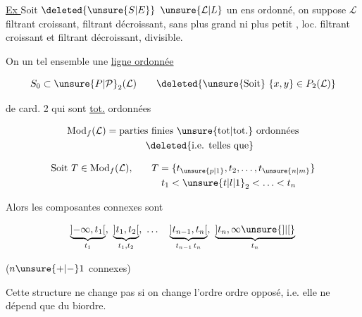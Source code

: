 
\uline{Ex }\quad Soit $\deleted{\unsure{S|E}}$ $\unsure{\mathcal L|L}$ un ens ordonné,
on suppose $\mathcal L$ filtrant croissant, filtrant
décroissant, sans plus grand ni
plus petit , loc. filtrant croissant
et filtrant décroissant, divisible.

On  un tel ensemble une
\uline{ligne ordonnée}

\[
S_0\subset\unsure{P|\mathcal P}_2(\mathcal L)\qquad
\deleted{\text{\unsure{Soit} }\{x,y\}\in P_2(\mathcal L)}
\]

\textquotedbl\quad {}  de card. 2  qui sont \uline{tot.} ordonnées

\[
\begin{aligned}
&\mathrm{Mod}_f(\mathcal L)=\text{parties finies \unsure{tot|tot.} ordonnées}\\
&\hspace{8em}\deleted{\text{i.e. telles que}}
\end{aligned}
\]

\[
\begin{aligned}
 \text{Soit }T\in\mathrm{Mod}_f(\mathcal L),\qquad &T=\{t_{\unsure{p|1}},t_2,\ldots,t_{\unsure{n|m}}\}\\
 &\quad t_1<\unsure{t|l|1}_2<\ldots<t_n
\end{aligned}
\]

Alors les composantes connexes sont

\[
\underbrace{\mathopen{]}-\infty,t_1\mathclose{[}}_{t_1},\
\underbrace{\mathopen{]}t_1,t_2\mathclose{[}}_{t_1,t_2},\
\ldots\quad
\underbrace{\mathopen{]}t_{n-1},t_n\mathclose{[}}_{t_{n-1}\,t_n},\
\underbrace{\mathopen{]}t_n,\infty\mathclose{\unsure{]|[}}}_{t_n}
\]


($n\unsure{+|-}1$  connexes)

\rotatebox{90}{\textsc{\unsure{t}rong Extra Str}}
\mspage{7}

Cette structure ne change pas si
on change l'ordre  ordre opposé,
i.e. elle ne dépend que du
biordre.

 

